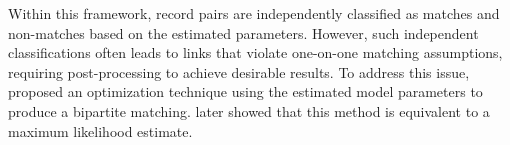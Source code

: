 \documentclass[ba]{imsart}
\begin{document}
Within this framework, record pairs are independently classified as matches and non-matches based on the estimated parameters. However, such independent classifications often leads to links that violate one-on-one matching assumptions, requiring post-processing to achieve desirable results. To address this issue, \cite{jaro1989} proposed an optimization technique using the estimated model parameters to produce a bipartite matching. \cite{sadinle_bayesian_2017} later showed that this method is equivalent to a maximum likelihood estimate.




%
\end{document}
